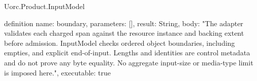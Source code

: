 \begin{lexlean}{Uorc.Product.InputModel}
\begin{semanticmodule}
definition{
  name: boundary,
  parameters: [],
  result: String,
  body: "The adapter validates each charged span against the resource instance and backing extent before admission. InputModel checks ordered object boundaries, including empties, and explicit end-of-input. Lengths and identities are control metadata and do not prove any byte equality. No aggregate input-size or media-type limit is imposed here.",
  executable: true
}
\end{semanticmodule}
\end{lexlean}
